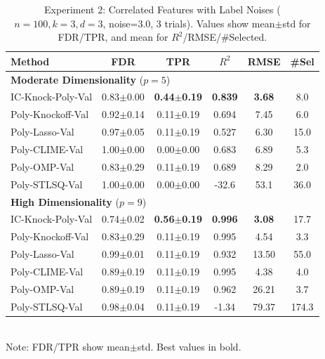 \begin{table}[htbp]
\centering
\caption{Experiment 2: Correlated Features with Label Noises ($n=100, k=3, d=3$, noise=3.0, 3 trials). Values show mean$\pm$std for FDR/TPR, and mean for $R^2$/RMSE/\#Selected.}
\label{tab:exp2-results}
\small
\begin{tabular}{lccccc}
\toprule
\textbf{Method} & \textbf{FDR} & \textbf{TPR} & \textbf{$R^2$} & \textbf{RMSE} & \textbf{\#Sel} \\
\midrule
\multicolumn{6}{l}{\textbf{Moderate Dimensionality} ($p=5$)} \\
\midrule
IC-Knock-Poly-Val & 0.83$\pm$0.00 & \textbf{0.44$\pm$0.19} & \textbf{0.839} & \textbf{3.68} & 8.0 \\
Poly-Knockoff-Val & 0.92$\pm$0.14 & 0.11$\pm$0.19 & 0.694 & 7.45 & 6.0 \\
Poly-Lasso-Val & 0.97$\pm$0.05 & 0.11$\pm$0.19 & 0.527 & 6.30 & 15.0 \\
Poly-CLIME-Val & 1.00$\pm$0.00 & 0.00$\pm$0.00 & 0.683 & 6.89 & 5.3 \\
Poly-OMP-Val & 0.83$\pm$0.29 & 0.11$\pm$0.19 & 0.689 & 8.29 & 2.0 \\
Poly-STLSQ-Val & 1.00$\pm$0.00 & 0.00$\pm$0.00 & -32.6 & 53.1 & 36.0 \\
\midrule
\multicolumn{6}{l}{\textbf{High Dimensionality} ($p=9$)} \\
\midrule
IC-Knock-Poly-Val & 0.74$\pm$0.02 & \textbf{0.56$\pm$0.19} & \textbf{0.996} & \textbf{3.08} & 17.7 \\
Poly-Knockoff-Val & 0.83$\pm$0.29 & 0.11$\pm$0.19 & 0.995 & 4.54 & 3.3 \\
Poly-Lasso-Val & 0.99$\pm$0.01 & 0.11$\pm$0.19 & 0.932 & 13.50 & 55.0 \\
Poly-CLIME-Val & 0.89$\pm$0.19 & 0.11$\pm$0.19 & 0.995 & 4.38 & 4.0 \\
Poly-OMP-Val & 0.89$\pm$0.19 & 0.11$\pm$0.19 & 0.962 & 26.21 & 3.7 \\
Poly-STLSQ-Val & 0.98$\pm$0.04 & 0.11$\pm$0.19 & -1.34 & 79.37 & 174.3 \\
\bottomrule
\end{tabular}
\\[3pt]
\footnotesize{Note: FDR/TPR show mean$\pm$std. Best values in bold.}
\end{table}

